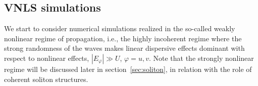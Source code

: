 \documentclass[pra,twocolumn,showpacs,preprintnumbers,amsmath,amssymb]{revtex4}
\begin{document}
\subsection{VNLS simulations}

We start to consider numerical simulations realized in the so-called weakly nonlinear regime of propagation, i.e., the highly incoherent regime where the strong randomness of the waves makes linear dispersive effects dominant with respect to nonlinear effects, $|E_\varphi| \gg U$, $\varphi=u,v$.
Note that the strongly nonlinear regime will be discussed later in section~\ref{sec:soliton}, in relation with the role of coherent soliton  structures. 
\end{document}
